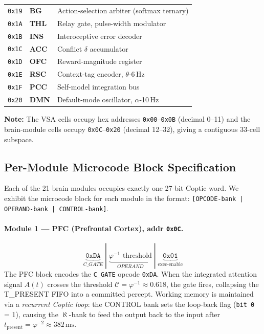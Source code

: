 \begin{table}[H]
\begin{tabular}{rll}
\texttt{0x19} & \textbf{BG}   & Action-selection arbiter (softmax ternary) \\
\texttt{0x1A} & \textbf{THL}  & Relay gate, pulse-width modulator \\
\texttt{0x1B} & \textbf{INS}  & Interoceptive error decoder \\
\texttt{0x1C} & \textbf{ACC}  & Conflict $\delta$ accumulator \\
\texttt{0x1D} & \textbf{OFC}  & Reward-magnitude register \\
\texttt{0x1E} & \textbf{RSC}  & Context-tag encoder, $\theta$-6\,Hz \\
\texttt{0x1F} & \textbf{PCC}  & Self-model integration bus \\
\texttt{0x20} & \textbf{DMN}  & Default-mode oscillator, $\alpha$-10\,Hz \\
\bottomrule
\end{tabular}
\end{table}

\textbf{Note:} The VSA cells occupy hex addresses
\texttt{0x00}--\texttt{0x0B} (decimal 0--11) and the brain-module
cells occupy \texttt{0x0C}--\texttt{0x20} (decimal 12--32),
giving a contiguous 33-cell subspace.

\subsection{Per-Module Microcode Block Specification}
\label{sec:73:per-module-spec}

Each of the 21 brain modules occupies exactly one 27-bit Coptic
word.  We exhibit the microcode block for each module in the format:
\texttt{[OPCODE-bank | OPERAND-bank | CONTROL-bank]}.

\paragraph{Module 1 — PFC (Prefrontal Cortex), addr \texttt{0x0C}.}
\[
  \underbrace{\mathtt{0xDA}}_{C\_GATE}
  \;|\;
  \underbrace{\varphi^{-1} \text{ threshold}}_{OPERAND}
  \;|\;
  \underbrace{\mathtt{0x01}}_{\text{exec-enable}}
\]
The PFC block encodes the \texttt{C\_GATE} opcode \texttt{0xDA}.
When the integrated attention signal $A(t)$ crosses the threshold
$\mathcal{C} = \varphi^{-1} \approx 0.618$, the gate fires,
collapsing the T\_PRESENT FIFO into a committed percept.
Working memory is maintained via a \emph{recurrent Coptic loop}:
the CONTROL bank sets the loop-back flag (\texttt{bit~0} = 1),
causing the $\aleph$-bank to feed the output back to the input
after $t_{\mathrm{present}} = \varphi^{-2} \approx 382\,\mathrm{ms}$.

